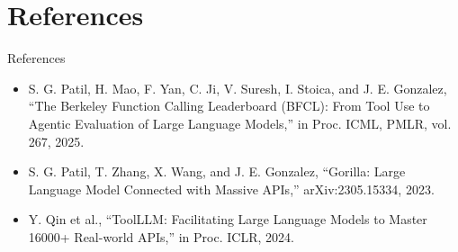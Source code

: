 \documentclass{beamer}
\begin{document}
\section{References}
\begin{frame}{References}
\footnotesize
\begin{itemize}
\item S. G. Patil, H. Mao, F. Yan, C. Ji, V. Suresh, I. Stoica, and J. E. Gonzalez, ``The Berkeley Function Calling Leaderboard (BFCL): From Tool Use to Agentic Evaluation of Large Language Models,'' in Proc. ICML, PMLR, vol. 267, 2025.
\item S. G. Patil, T. Zhang, X. Wang, and J. E. Gonzalez, ``Gorilla: Large Language Model Connected with Massive APIs,'' arXiv:2305.15334, 2023.
\item Y. Qin et al., ``ToolLLM: Facilitating Large Language Models to Master 16000+ Real-world APIs,'' in Proc. ICLR, 2024.
\end{itemize}
\end{frame}
\begin{frame}\vfill{}\vfill\end{frame}
\end{document}

